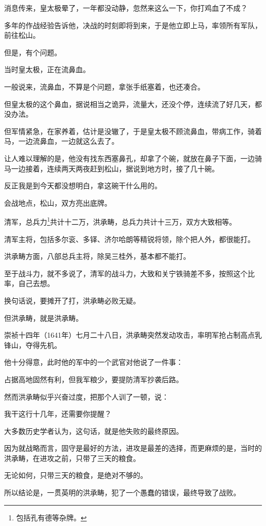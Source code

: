 \begin{multicols}{\theparacolNo}
		消息传来，皇太极晕了，一年都没动静，忽然来这么一下，你打鸡血了不成？

		多年的作战经验告诉他，决战的时刻即将到来，于是他立即上马，率领所有军队，前往松山。

		但是，有个问题。

		当时皇太极，正在流鼻血。

		一般说来，流鼻血，不算是个问题，拿张手纸塞着，也还凑合。

		但皇太极的这个鼻血，据说相当之诡异，流量大，还没个停，连续流了好几天，都没办法。

		但军情紧急，在家养着，估计是没辙了，于是皇太极不顾流鼻血，带病工作，骑着马，一边流鼻血，一边就这么去了。

		让人难以理解的是，他没有找东西塞鼻孔，却拿了个碗，就放在鼻子下面，一边骑马一边接着，连续两天两夜赶到松山，据说到地方时，接了几十碗。

		反正我是到今天都没想明白，拿这碗干什么用的。

		会战地点，松山，双方亮出底牌。

		清军，总兵力\footnote{包括孔有德等杂牌。}共计十二万，洪承畴，总兵力共计十三万，双方大致相等。

		清军主将，包括多尔衮、多铎、济尔哈朗等精锐将领，除个把人外，都很能打。

		洪承畴方面，八部总兵主将，除吴三桂外，基本都不能打。

		至于战斗力，就不多说了，清军的战斗力，大致和关宁铁骑差不多，按照这个比率，自己去想。

		换句话说，要摊开了打，洪承畴必败无疑。

		但洪承畴，就是洪承畴。

		崇祯十四年（1641年）七月二十八日，洪承畴突然发动攻击，率明军抢占制高点乳锋山，夺得先机。

		他十分得意，此时他的军中的一个武官对他说了一件事：

		占据高地固然有利，但我军粮少，要提防清军抄袭后路。

		然而洪承畴似乎兴奋过度，把那个人训了一顿，说：

		我干这行十几年，还需要你提醒？

		大多数历史学者认为，这句话，就是他失败的最终原因。

		因为就战略而言，固守是最好的方法，进攻是最差的选择，而更麻烦的是，当时的洪承畴，在进攻之前，只带了三天的粮食。

		无论如何，只带三天的粮食，是绝对不够的。

		所以结论是，一贯英明的洪承畴，犯了一个愚蠢的错误，最终导致了战败。


\end{multicols}
